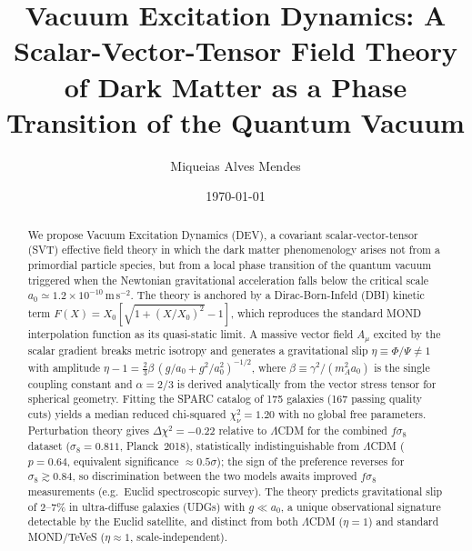 \documentclass[aps,prd,twocolumn,showpacs,superscriptaddress]{revtex4-2}
\newcommand{\aO}{a_0}
\newcommand{\LCDM}{$\Lambda$CDM}
\begin{document}
\title{Vacuum Excitation Dynamics: A Scalar-Vector-Tensor Field Theory
       of Dark Matter as a Phase Transition of the Quantum Vacuum}

\author{Miqueias Alves Mendes}

\date{\today}

\begin{abstract}
We propose Vacuum Excitation Dynamics (DEV), a covariant
scalar-vector-tensor (SVT) effective field theory in which the dark
matter phenomenology arises not from a primordial particle species,
but from a local phase transition of the quantum vacuum triggered when
the Newtonian gravitational acceleration falls below the critical scale
$\aO \simeq 1.2\times10^{-10}$\,m\,s$^{-2}$.
The theory is anchored by a Dirac-Born-Infeld (DBI) kinetic term
$F(X) = X_0[\sqrt{1+(X/X_0)^2}-1]$,
which reproduces the standard MOND interpolation function as its
quasi-static limit.
A massive vector field $A_\mu$ excited by the scalar gradient breaks
metric isotropy and generates a gravitational slip
$\eta \equiv \Phi/\Psi \neq 1$ with amplitude
$\eta - 1 = \frac{2}{3}\beta\,(g/\aO+g^2/\aO^2)^{-1/2}$,
where $\beta \equiv \gamma^2/(m_A^2 \aO)$ is the single coupling constant
and $\alpha = 2/3$ is derived analytically from the vector stress tensor
for spherical geometry.
Fitting the SPARC catalog of 175 galaxies (167 passing quality cuts)
yields a median reduced chi-squared $\chi^2_\nu = 1.20$
with no global free parameters.
Perturbation theory gives $\Delta\chi^2 = -0.22$ relative to \LCDM{}
for the combined $f\sigma_8$ dataset ($\sigma_8 = 0.811$, Planck~2018),
statistically indistinguishable from \LCDM{} ($p = 0.64$, equivalent
significance ${\approx}0.5\sigma$); the sign of the preference reverses
for $\sigma_8\gtrsim 0.84$, so discrimination between the two models
awaits improved $f\sigma_8$ measurements (e.g.\ Euclid spectroscopic
survey).
The theory predicts gravitational slip of $2$--$7\%$ in
ultra-diffuse galaxies (UDGs) with $g \ll \aO$, a unique
observational signature detectable by the Euclid satellite,
and distinct from both \LCDM{} ($\eta=1$) and
standard MOND/TeVeS ($\eta\approx 1$, scale-independent).
\end{abstract}

\end{document}
